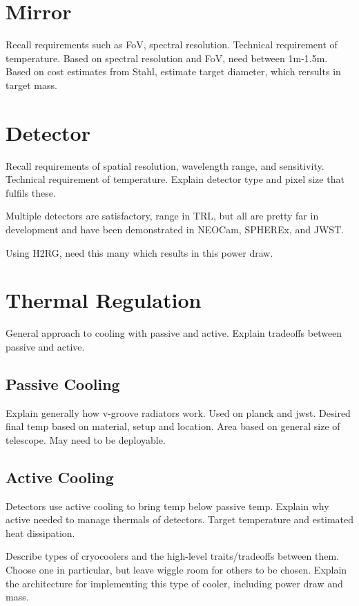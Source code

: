 \documentclass{ws-jai}
\begin{document}
\section{Mirror}
\label{S:mirror}
Recall requirements such as FoV, spectral resolution. Technical requirement of temperature.
Based on spectral resolution and FoV, need between 1m-1.5m. Based on cost estimates from Stahl, estimate target diameter, which rersults in target mass.

\section{Detector}
\label{S:detector}
Recall requirements of spatial resolution, wavelength range, and sensitivity. Technical requirement of temperature. Explain detector type and pixel size that fulfils these.

Multiple detectors are satisfactory, range in TRL, but all are pretty far in development and have been demonstrated in NEOCam, SPHEREx, and JWST\@.

Using H2RG, need this many which results in this power draw.

\section{Thermal Regulation}
\label{S:tempregulation}
General approach to cooling with passive and active. Explain tradeoffs between passive and active.

\subsection{Passive Cooling}
\label{sS:vgrooves}
Explain generally how v-groove radiators work. Used on planck and jwst. Desired final temp based on material, setup and location. Area based on general size of telescope. May need to be deployable.

\subsection{Active Cooling}
\label{sS:cryocooler}
Detectors use active cooling to bring temp below passive temp. Explain why active needed to manage thermals of detectors. Target temperature and estimated heat dissipation.

Describe types of cryocoolers and the high-level traits/tradeoffs between them. Choose one in particular, but leave wiggle room for others to be chosen. Explain the architecture for implementing this type of cooler, including power draw and mass.
\end{document}
